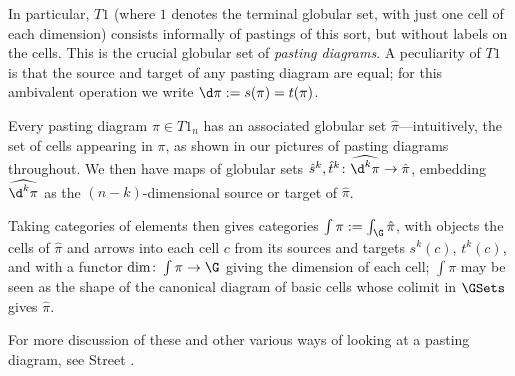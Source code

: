 \noindent In particular, $T1$ (where $1$ denotes the terminal globular set, with just one cell of each dimension) consists informally of pastings of this sort, but without labels on the cells.  This is the crucial globular set of \emph{pasting diagrams}.  A peculiarity of $T1$ is that the source and target of any pasting diagram are equal; for this ambivalent operation we write $\d \pi := s(\pi) = t(\pi)$. 

Every pasting diagram $\pi \in T1_n$ has an associated globular set $\hat{\pi}$---intuitively, the set of cells appearing in $\pi$, as shown in our pictures of pasting diagrams throughout.  We then have maps of globular sets $\hat{s}^k, \hat{t}^k\colon  \widehat{\d^k \pi} \to \hat \pi$, embedding $\widehat{\d^k \pi}$ as the $(n-k)$-dimensional source or target of  $\hat \pi$.

Taking categories of elements then gives categories $\int \pi := \int_\G \hat{\pi}$, with objects the cells of $\hat{\pi}$ and arrows into each cell $c$ from its sources and targets $s^k(c)$, $t^k(c)$, and with a functor $\dim \colon  \int \pi \to \G$ giving the dimension of each cell; $\int \pi$ may be seen as the shape of the canonical diagram of basic cells whose colimit in $\GSets$ gives $\hat{\pi}$.

For more discussion of these and other various ways of looking at a pasting diagram, see Street \cite{street:petit-topos}.


